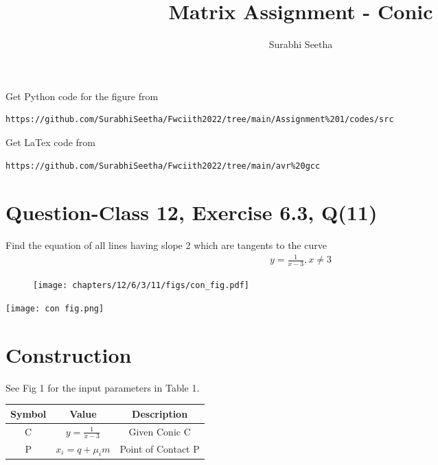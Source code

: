 \documentclass[journal,12pt,twocolumn]{IEEEtran}
\begin{document}
\def\putbox#1#2#3{\makebox[0in][l]{\makebox[#1][l]{}\raisebox{\baselineskip}[0in][0in]{\raisebox{#2}[0in][0in]{#3}}}}
     \def\rightbox#1{\makebox[0in][r]{#1}}
     \def\centbox#1{\makebox[0in]{#1}}
     \def\topbox#1{\raisebox{-\baselineskip}[0in][0in]{#1}}
     \def\midbox#1{\raisebox{-0.5\baselineskip}[0in][0in]{#1}}
\vspace{3cm}
\title{\textbf{Matrix Assignment - Conic} }
\author{Surabhi Seetha}
\maketitle
\newpage
\bigskip
\renewcommand{\thefigure}{\theenumi}
\renewcommand{\thetable}{\theenumi}
Get Python code for the figure from 
\begin{lstlisting}
https://github.com/SurabhiSeetha/Fwciith2022/tree/main/Assignment%201/codes/src
\end{lstlisting}
Get LaTex code from
\begin{lstlisting}
https://github.com/SurabhiSeetha/Fwciith2022/tree/main/avr%20gcc
\end{lstlisting}
%
\section{Question-Class 12, Exercise 6.3, Q(11)}
\raggedright
\fi
Find the equation of all lines having slope 2 which are tangents to the curve 
\begin{align}
y=\frac{1}{x-3}, x\neq{3} 
\end{align}
\solution 
	\begin{figure}[!ht]
		\centering
 \texttt{[image: chapters/12/6/3/11/figs/con\_fig.pdf]}
		\caption{}
		\label{fig:12/6/3/11}
  	\end{figure}
	\iffalse
\vspace{0.25cm}
\texttt{[image: con fig.png]}\\
\label{fig:circle_1}

 \section*{Construction}
 
See Fig 1 for the input parameters in Table 1.\\
\vspace{0.5cm}
{\setlength\extrarowheight{2pt}
\begin{tabular}{|c|c|c|}
	\hline
	\textbf{Symbol}&\textbf{Value}&\textbf{Description}\\
	\hline
	C & $y = \frac{1}{x-3}$ & Given Conic C\\
	\hline
	P & $x_i = q + \mu_i m$ & Point of Contact P\\
	\hline
\end{tabular}
}\\
\vspace{0.25cm}
\\
\end{document}
